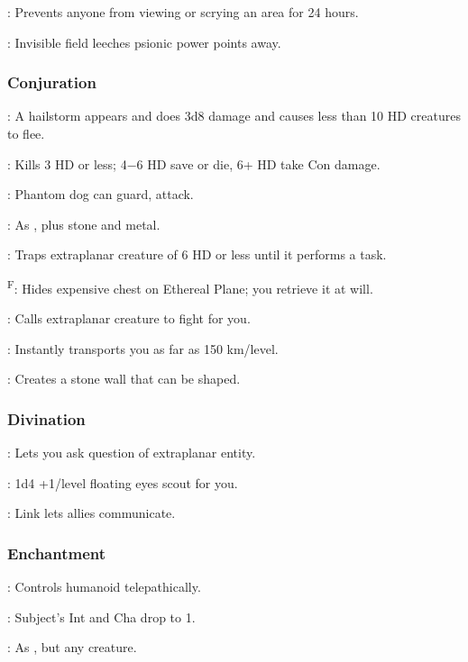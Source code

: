 	: Prevents anyone from viewing or scrying an area for 24 hours.

	: Invisible field leeches psionic power points away.

\subsubsection{Conjuration}
	: A hailstorm appears and does 3d8 damage and causes less than 10 HD creatures to flee. %

	: Kills 3 HD or less; 4$-6$ HD save or die, 6+ HD take Con damage.

	: Phantom dog can guard, attack.

	: As , plus stone and metal.

	: Traps extraplanar creature of 6 HD or less until it performs a task.

	\textsuperscript{F}: Hides expensive chest on Ethereal Plane; you retrieve it at will.

	: Calls extraplanar creature to fight for you.

	: Instantly transports you as far as 150 km/level.

	: Creates a stone wall that can be shaped.

\subsubsection{Divination}
	: Lets you ask question of extraplanar entity.

	: 1d4 +1/level floating eyes scout for you.

	: Link lets allies communicate.

\subsubsection{Enchantment}
	: Controls humanoid telepathically.

	: Subject's Int and Cha drop to 1.

	: As , but any creature.


